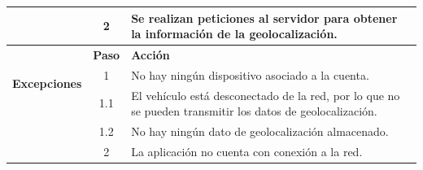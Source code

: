 \begin{table}[H]
\begin{tabularx}{\textwidth}{|c|c|X|}
    \cline{2-3}
                                                & 2                                                                                                                                                                                           & \multicolumn{1}{L|}{Se realizan peticiones al servidor para obtener la información de la geolocalización.}                                                        \\
    \hline
    \multirow{3}{*}{\textbf{Excepciones}}       & \textbf{Paso}                                                                                                                                                                               & \textbf{Acción}                                                                                                                                                   \\
    \cline{2-3}
                                                & 1                                                                                                                                                                                           & \multicolumn{1}{L|}{No hay ningún dispositivo asociado a la cuenta.}                                                                                              \\
    \cline{2-3}
                                                & 1.1                                                                                                                                                                                         & \multicolumn{1}{L|}{El vehículo está desconectado de la red, por lo que no se pueden transmitir los datos de geolocalización.}                                    \\
    \cline{2-3}
                                                & 1.2                                                                                                                                                                                         & \multicolumn{1}{L|}{No hay ningún dato de geolocalización almacenado.}                                                                                            \\
    \cline{2-3}
                                                & 2                                                                                                                                                                                           & \multicolumn{1}{L|}{La aplicación no cuenta con conexión a la red.}                                                                                               \\

\end{tabularx}
\end{table}
